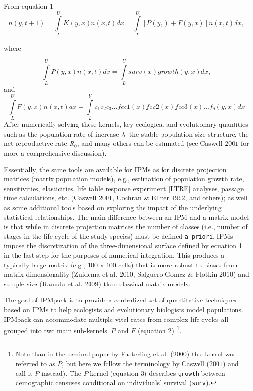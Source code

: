 \documentclass{article}
\begin{document}
From equation 1: 
\begin{equation}
n(y, t+1) = \int\limits_{L}^{U} K(y, x) n(x, t) dx = \int\limits_{L}^{U}
[P(y, ) + F(y, x)] n(x, t) dx ,
\end{equation}

where

\begin{equation}
 \int\limits_{L}^{U} P(y, x) n(x, t) dx = \int\limits_{L}^{U}surv(x)growth(y, x)dx ,    
\end{equation}
and
\begin{equation}
 \int\limits_{L}^{U} F(y, x) n(x, t) dx = \int\limits_{L}^{U}
c_1 c_2 c_3 ... fec1(x)fec2(x)fec3(x)...f_d(y, x)dx     
\end{equation}
After numerically solving these kernels, key ecological and evolutionary quantities such as the population rate of increase $\lambda$, the stable population size structure, the net reproductive rate $R_0$, and many others can be estimated (see Caswell $2001$ for more a comprehensive discussion). 

Essentially, the same tools are available for IPMs as for discrete projection
matrices (matrix population models), e.g., estimation of population
growth rate, sensitivities, elasticities, life table response
experiment [LTRE] analyses, passage time calculations, etc. (Caswell
$2001$, Cochran \& Ellner $1992$, and others); as well as some
additional tools based on exploring the impact of the underlying
statistical relationships. The main difference
between an IPM and a matrix model is that while in discrete projection
matrices the number of classes (i.e., number of stages in the life
cycle of the study species) must be defined {\tt a priori}, IPMs
impose the discretization of the three-dimensional surface defined by
equation 1 in the last step for the purposes of numerical integration. This produces a typically large matrix (e.g., $100$ x $100$ cells) that is more robust to biases from matrix dimensionality (Zuidema et al. $2010$, Salguero-Gomez \& Plotkin $2010$) and sample size (Ramula et al. $2009$) than classical matrix models.

The goal of IPMpack is to provide a centralized set of quantitative techniques based on IPMs to help ecologists and evolutionary biologists model populations. IPMpack can accommodate multiple vital rates from complex life cycles all grouped into two main sub-kernels: $P$ and $F$ (equation 2) \footnote{Note than in the seminal paper by Easterling et al. ($2000$) this kernel was referred to as $P$, but here we follow the terminology by Caswell ($2001$) and call it $P$ instead). The $P$ kernel (equation 3) describes {\tt growth} between demographic censuses conditional on individuals' survival ({\tt surv}).
}.
\end{document}
